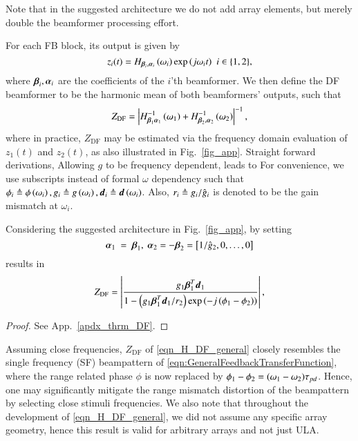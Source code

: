 Note that in the suggested architecture we do not add array elements, but merely double the beamformer processing effort. 
\par For each FB block, its output is given by
\[
z_{i}(t)=H_{\vBetaI{i},\vAlphaI{i}}\rBrace{\omega_{i}}\exp{\rBrace{j\omega_{i}t}}\ \ {i\in\cBrace{1,2}},
\]
where $\boldsymbol{\beta}_{i},\boldsymbol{\alpha}_{i}$ are the coefficients of the $i$'th beamformer. 
We then define the DF beamformer to be the harmonic mean of both beamformers' outputs, such that
\begin{equation}
    \label{eqn_HDF_def}
    Z_{\text{DF}} = \abs{H^{-1}_{\vBetaI{1}\vAlphaI{1}}\rBrace{\omega_{1}}+H^{-1}_{\vBetaI{2},\vAlphaI{2}}\rBrace{\omega_{2}}}^{-1},
\end{equation}
where in practice, $Z_{\text{DF}}$ may be estimated via the frequency domain evaluation of $z_1(t)$ and $z_2(t)$, as also illustrated in Fig.~\ref{fig_app}.
\ifdefined\useOmega
Straight forward derivations, Allowing $g$ to be frequency dependent, leads to
\else
For convenience, we use subscripts instead of formal $\omega$ dependency such that $\phi_{i}\triangleq\phi\left({\omega_{i}}\right), g_{i}\triangleq{}g\left({\omega_{i}}\right), \boldsymbol{d}_{i}\triangleq\boldsymbol{d}\left({\omega_{i}}\right)$.
Also, $r_i\triangleq{}g_{i}/\hat{g}_{i}$ is denoted to be the gain mismatch at $\omega_i$.


\begin{theorem}
\label{thrm_DF}
Considering the suggested architecture in Fig.~\ref{fig_app}, by setting 
\begin{equation}\label{eqn_simpleBeta}
    \vAlphaI{1}~=~\vBetaI{1},\ \vAlphaI{2}=-\vBetaI{2}=\vBrace{1/\gIHat{2},0,\hdots,0}
\end{equation}
results in 
\begin{equation}
    Z_{\text{DF}} = \lBrace{\frac{\gI{1}\vBetaTI{1}\vdI{1}}{1-
    \rBrace{\gI{1}\vBetaTI{1}\vdI{1}/r_{2}}\exp\rBrace{-j\rBrace{\phiI{1}-\phiI{2}}}
    }},
    \label{eqn_H_DF_general}
\end{equation}
\end{theorem}

\begin{proof}
See App.~\ref{apdx_thrm_DF}. 
\end{proof}
\par Assuming close frequencies, $Z_{\text{DF}}$ of  \eqref{eqn_H_DF_general} closely resembles the single frequency (SF) beampattern of  \eqref{eqn:GeneralFeedbackTransferFunction}, where the range related phase $\phi$ is now replaced by  $\phi_{1}-\phi_{2}=(\omega_1-\omega_2)\tau_{pd}$. 
Hence, one may significantly mitigate the range mismatch distortion of the beampattern by selecting close stimuli frequencies.
We also note that throughout the development of \eqref{eqn_H_DF_general}, we did not assume any specific array geometry, hence this result is valid for arbitrary arrays and not just ULA.

